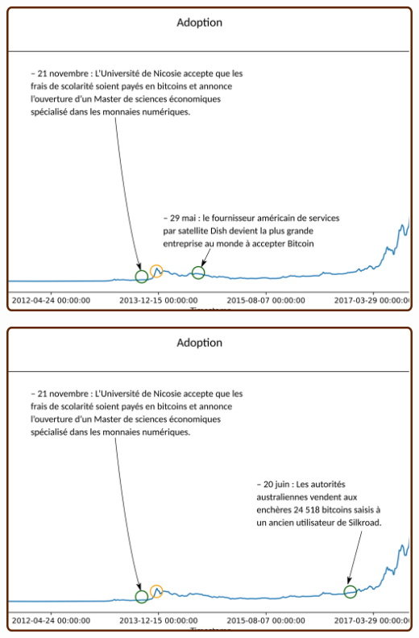\documentclass[presentation]{beamer}
\begin{document}
\begin{frame}[label={sec:org93e28e2}]{}
\begin{center}
\includegraphics[width=.95\textwidth]{./Pictures/Timeline/24adoption_network.png}
\end{center}
\end{frame}

\begin{frame}[label={sec:org3d51639}]{}
\begin{center}
\includegraphics[width=.95\textwidth]{./Pictures/Timeline/25adoption_enchere.png}
\end{center}
\end{frame}
\end{document}

